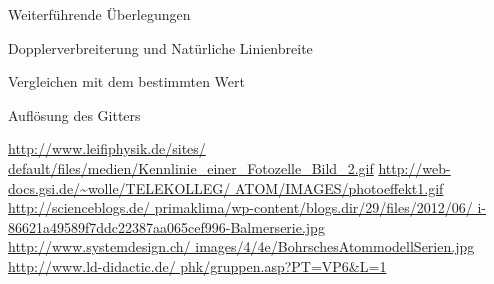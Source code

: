 \documentclass[pdftex, a4paper,11pt, twoside, ngerman]{report}
\begin{document}
\begin{chapter}{Weiterführende Überlegungen}
\begin{section}{Dopplerverbreiterung und Natürliche Linienbreite}
\begin{subsection}{Vergleichen mit dem bestimmten Wert}
        
        
      \end{subsection}
   
    \end{section}
    
    
    
    \begin{section}{Auflösung des Gitters}
      \label{chp:Weiterfuehrendes:sec:Gitteraufloesung}
      
      
      
    \end{section}
  
  \end{chapter}
    
  
  
  
  
  
  
  
  \begin{thebibliography}{99}
    \scriptsize
    \url{http://www.leifiphysik.de/sites/
        default/files/medien/Kennlinie_einer_Fotozelle_Bild_2.gif}
    \url{http://web-docs.gsi.de/~wolle/TELEKOLLEG/
        ATOM/IMAGES/photoeffekt1.gif}
    \url{http://scienceblogs.de/
        primaklima/wp-content/blogs.dir/29/files/2012/06/
        i-86621a49589f7ddc22387aa065cef996-Balmerserie.jpg}
    \url{http://www.systemdesign.ch/
        images/4/4e/BohrschesAtommodellSerien.jpg}
     \url{http://www.ld-didactic.de/ 
        phk/gruppen.asp?PT=VP6&L=1}
   
  \end{thebibliography}
 
\end{document}
